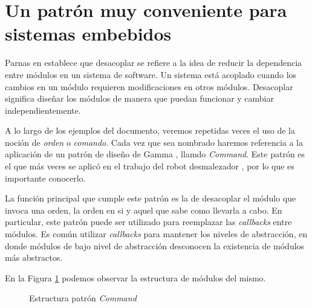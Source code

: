 \section{Un patrón muy conveniente para sistemas embebidos}
\label{patronCommand}

Parnas en \cite{Parnas1972} establece que desacoplar se refiere a la idea de reducir la dependencia entre módulos en un sistema de software. Un sistema está acoplado cuando los cambios en un módulo requieren modificaciones en otros módulos. Desacoplar significa diseñar los módulos de manera que puedan funcionar y cambiar independientemente.

A lo largo de los ejemplos del documento, veremos repetidas veces el uso de la noción de \textit{orden} o \textit{comando}. Cada vez que sea nombrado haremos referencia a la aplicación de un patrón de diseño de Gamma \cite{Gamma:1995:DPE:186897}, llamdo \textit{Command}. Este patrón es el que más veces se aplicó en el trabajo del robot desmalezador \cite{laura}, por lo que es importante conocerlo.

La función principal que cumple este patrón es la de desacoplar el módulo que invoca una orden, la orden en si y aquel que sabe como llevarla a cabo. En particular, este patrón puede ser utilizado para reemplazar las \textit{callbacks} entre módulos. Es común utilizar \textit{callbacks} para mantener los niveles de abstracción, en donde módulos de bajo nivel de abstracción desconocen la existencia de módulos más abstractos.

En la Figura \ref{commandEst} podemos observar la estructura de módulos del mismo.


\begin{figure}[H]
\caption{Estructura patrón \textit{Command}}
\label{commandEst}
\begin{center}
\end{center}
\end{figure}


